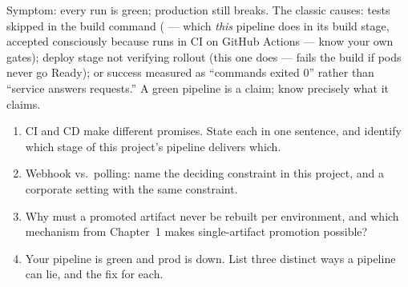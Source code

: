 \begin{pitfall}
Symptom: every run is green; production still breaks. The classic
causes: tests skipped in the build command ( --- which
\emph{this} pipeline does in its build stage, accepted consciously
because  runs in CI on GitHub Actions --- know your
own gates); deploy stage not verifying rollout (this one does ---
 fails the build if pods never go Ready); or
success measured as ``commands exited 0'' rather than ``service
answers requests.'' A green pipeline is a claim; know precisely what it
claims.
\end{pitfall}

\begin{quiz}
\begin{enumerate}
  \item CI and CD make different promises. State each in one sentence,
  and identify which stage of this project's pipeline delivers which.
  \item Webhook vs.\ polling: name the deciding constraint in this
  project, and a corporate setting with the same constraint.
  \item Why must a promoted artifact never be rebuilt per environment,
  and which mechanism from Chapter~1 makes single-artifact promotion
  possible?
  \item Your pipeline is green and prod is down. List three distinct
  ways a pipeline can lie, and the fix for each.
\end{enumerate}
\end{quiz}
